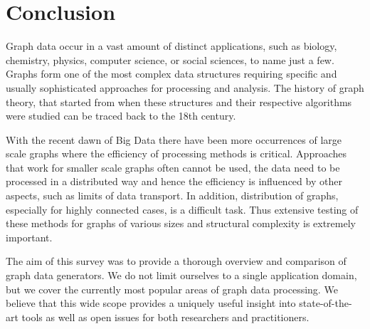 \section{Conclusion}
\label{sec:conclusion}

Graph data occur in a vast amount of distinct applications, such as biology, chemistry, physics, computer science, or social sciences, to name just a few. Graphs form one of the most complex data structures requiring specific and usually sophisticated approaches for processing and analysis. The history of graph theory,  that started from when these structures and their respective algorithms were studied can be traced back to the 18th century.

With the recent dawn of Big Data there have  been more occurrences of large scale graphs where the efficiency   of  processing methods is critical.  Approaches that work for smaller scale graphs often cannot be used, the data need to be processed in a distributed way and hence the efficiency is influenced by other aspects, such as limits of data transport. In addition, distribution of graphs, especially for highly connected cases, is a difficult task. Thus extensive testing of these methods for graphs of various sizes and structural complexity is extremely important.

The aim of this survey was to provide a thorough overview and comparison of graph data generators. We do not limit ourselves to a single application domain, but we cover the currently most popular areas of graph data processing. We believe that this wide scope provides a uniquely useful insight into state-of-the-art tools as well as open issues for both researchers and practitioners.
